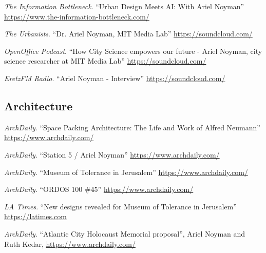 \begin{tablist}
    \item[`25] \tab \textit{The Information Bottleneck}. \enquote{Urban Design Meets AI: With Ariel Noyman}
    \href{https://www.the-information-bottleneck.com/ep6-urban-design-meets-ai-with-ariel-noyman/}{https://www.the-information-bottleneck.com/}

    \item[`22] \tab \textit{The Urbanists}. \enquote{Dr. Ariel Noyman, MIT Media Lab}
    \href{https://soundcloud.com/omer-raz/40a}{https://soundcloud.com/}

    \item[`19] \tab \textit{OpenOffice Podcast}. \enquote{How City Science empowers our future - Ariel Noyman, city science researcher at MIT Media Lab}
    \href{https://soundcloud.com/openofficepodcast/5-how-city-science-empowers-our-future-ariel-noyman-city-science-researcher-at-mit-media-lab}{https://soundcloud.com/}

    \item[`18] \tab \textit{EretzFM Radio}. \enquote{Ariel Noyman - Interview}
    \href{https://soundcloud.com/eretzfm/070119a-3}{https://soundcloud.com/}


    \subsection*{Architecture}
    \item[`15] \tab \textit{ArchDaily}. \enquote{Space Packing Architecture: The Life and Work of Alfred Neumann}
    \href{https://www.archdaily.com/633053/space-packing-architecture-the-life-and-work-of-alfred-neumann}{https://www.archdaily.com/}

    \item[`12] \tab \textit{ArchDaily}. \enquote{Station 5 / Ariel Noyman}
    \href{https://www.archdaily.com/117870/station-5-ariel-noyman}{https://www.archdaily.com/}

    \item[`10] \tab \textit{ArchDaily}. \enquote{Museum of Tolerance in Jerusalem}
    \href{https://www.archdaily.com/81319/museum-of-tolerance-in-jerusalem-chyutin-architects}{https://www.archdaily.com/}

    \item[`10] \tab \textit{ArchDaily}. \enquote{ORDOS 100 \#45}
    \href{https://www.archdaily.com/32535/ordos-100-45-efrat-kowalsky-architects}{https://www.archdaily.com/}

    \item[`10] \tab \textit{LA Times}. \enquote{New designs revealed for Museum of Tolerance in Jerusalem}
    \href{https://latimesblogs.latimes.com/culturemonster/2010/09/simon-wiesenthal-center-unveils-new-designs-for-museum-of-tolerance-in-jerusalem-.html}{https://latimes.com}


    \item[`11] \tab \textit{ArchDaily}. \enquote{Atlantic City Holocaust Memorial proposal}, Ariel Noyman and Ruth Kedar,
    \href{https://www.archdaily.com/92128/atlantic-city-holocaust-memorial-proposal-ariel-noyman-and-ruth-kedar}{https://www.archdaily.com/}


\end{tablist}

